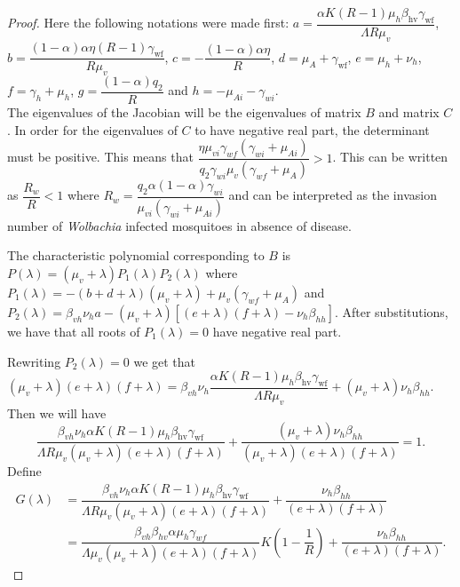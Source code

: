 \documentclass{ws-rv9x6}
\begin{document}
\begin{proof}
\noindent Here the following notations were made first:
\vspace{0.2in}
\noindent $a=\dfrac{\alpha  K (R-1) \mu _h \beta _{\text{hv}} \gamma
   _{\text{wf}}}{\Lambda  R \mu _v}$, $b=\dfrac{(1-\alpha) \alpha  \eta  (R-1) \gamma _{\text{wf}}}{R
   \mu _v}$, $c=-\dfrac{(1-\alpha) \alpha  \eta }{R}$, $d=\mu _A+\gamma _{\text{wf}}$, $e=\mu _h+\nu _h$, $f=\gamma _h+\mu _h$, $g=\dfrac{(1-\alpha)q_2}{R}$ 
   and $h=-\mu_{Ai}-\gamma_{wi}$.\\
   
   The eigenvalues of the Jacobian will be the eigenvalues of matrix $B$ and matrix $C$. In order for the eigenvalues of $C$ to have negative real part, the determinant must be positive. This means that 
$\dfrac{\eta \mu_{vi}\gamma_{wf}(\gamma_{wi}+\mu_{Ai})}{q_2\gamma_{wi}\mu_v(\gamma_{wf}+\mu_A)}>1$. This can be written as $\dfrac{R_w}{R}<1$ where $R_w=\dfrac{q_2\alpha(1-\alpha)\gamma_{wi}}{\mu_{vi}(\gamma_{wi}+\mu_{Ai})}$ and can be interpreted as the invasion number of \textit{Wolbachia} infected mosquitoes in absence of disease. 

The characteristic polynomial corresponding to $B$ is
$P(\lambda)=(\mu_v+\lambda)P_1(\lambda)P_2(\lambda)$ where $P_1(\lambda)=-(b+d+\lambda)(\mu_v+\lambda)+\mu_v(\gamma_{wf}+\mu_A)$ and $P_2(\lambda)=\beta_{vh}\nu_ha-(\mu_v+\lambda)\left[(e+\lambda)(f+\lambda)-\nu_h\beta_{hh}\right].$ After substitutions, we have that all roots of $P_1(\lambda)=0$ have negative real part.

Rewriting $P_2(\lambda)=0$ we get that $(\mu_v+\lambda)(e+\lambda)(f+\lambda)=\beta_{vh}\nu_h\dfrac{\alpha  K (R-1) \mu _h \beta _{\text{hv}} \gamma
   _{\text{wf}}}{\Lambda  R \mu _v}+(\mu_v+\lambda)\nu_h\beta_{hh}.$ Then we will have
   $$\dfrac{\beta_{vh}\nu_h\alpha  K (R-1) \mu _h \beta _{\text{hv}} \gamma
   _{\text{wf}}}{\Lambda  R \mu _v(\mu_v+\lambda)(e+\lambda)(f+\lambda)}+\dfrac{(\mu_v+\lambda)\nu_h\beta_{hh}}{(\mu_v+\lambda)(e+\lambda)(f+\lambda)}=1.$$ 
   Define 
   \begin{align*}
       G(\lambda) &= \dfrac{\beta_{vh}\nu_h\alpha  K (R-1) \mu _h \beta _{\text{hv}} \gamma
   _{\text{wf}}}{\Lambda  R \mu _v(\mu_v+\lambda)(e+\lambda)(f+\lambda)}+\dfrac{\nu_h\beta_{hh}}{(e+\lambda)(f+\lambda)}\\
   &= \dfrac{\beta_{vh}\beta_{hv}\alpha\mu_h\gamma_{wf}}{\Lambda\mu_v(\mu_v+\lambda)(e+\lambda)(f+\lambda)}K\left(1-\dfrac{1}{R}\right)+\dfrac{\nu_h\beta_{hh}}{(e+\lambda)(f+\lambda)}.
   \end{align*}


\end{proof}
\end{document}
